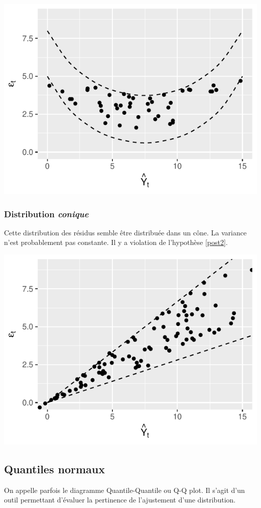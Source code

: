 \documentclass[11pt,french]{report}
\begin{document}
\bigskip
\includegraphics{notes_de_cours-032}

\subsubsection{Distribution \emph{conique}}
Cette distribution des résidus semble être distribuée dans un cône. La variance n'est probablement pas constante. Il y a violation de l'hypothèse \ref{post2}. 

\bigskip
\includegraphics{notes_de_cours-033}

\subsection{Quantiles normaux}
On appelle parfois le diagramme Quantile-Quantile ou Q-Q plot. Il s'agit d'un outil permettant d'évaluer la pertinence de l'ajustement d'une distribution. \newline
\end{document}
